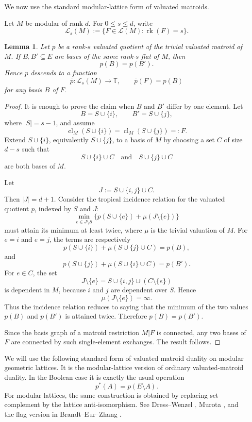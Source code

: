 \documentclass[11pt]{article}
\newcommand{\rk}{\operatorname{rk}}
\newcommand{\cl}{\operatorname{cl}}
\newcommand{\cL}{\mathcal L}
\theoremstyle{plain}
\newtheorem{lemma}[theorem]{Lemma}
\theoremstyle{definition}
\begin{document}
We now use the standard modular-lattice form of valuated matroids.

Let \(M\) be modular of rank \(d\).  For \(0\le s\le d\), write
\[
   \cL_s(M):=\{F\in \cL(M):\rk(F)=s\}.
\]

\begin{lemma}\label{lem:flat-invariance}
Let \(p\) be a rank-\(s\) valuated quotient of the trivial valuated matroid of \(M\).  If \(B,B'\subseteq E\) are bases of the same rank-\(s\) flat of \(M\), then
\[
   p(B)=p(B').
\]
Hence \(p\) descends to a function
\[
   \bar p:\cL_s(M)\longrightarrow \mathbb T,\qquad
   \bar p(F)=p(B)
\]
for any basis \(B\) of \(F\).
\end{lemma}

\begin{proof}
It is enough to prove the claim when \(B\) and \(B'\) differ by one element.  Let
\[
   B=S\cup\{i\},\qquad B'=S\cup\{j\},
\]
where \(|S|=s-1\), and assume
\[
   \cl_M(S\cup\{i\})=\cl_M(S\cup\{j\})=:F.
\]
Extend \(S\cup\{i\}\), equivalently \(S\cup\{j\}\), to a basis of \(M\) by choosing a set \(C\) of size \(d-s\) such that
\[
   S\cup\{i\}\cup C
   \quad\text{and}\quad
   S\cup\{j\}\cup C
\]
are both bases of \(M\).

Let
\[
   J:=S\cup\{i,j\}\cup C.
\]
Then \(|J|=d+1\).  Consider the tropical incidence relation for the valuated quotient \(p\), indexed by \(S\) and \(J\):
\[
   \min_{e\in J\setminus S}\{p(S\cup\{e\})+\mu(J\setminus\{e\})\}
\]
must attain its minimum at least twice, where \(\mu\) is the trivial valuation of \(M\).  For \(e=i\) and \(e=j\), the terms are respectively
\[
   p(S\cup\{i\})+\mu(S\cup\{j\}\cup C)=p(B),
\]
and
\[
   p(S\cup\{j\})+\mu(S\cup\{i\}\cup C)=p(B').
\]
For \(e\in C\), the set
\[
   J\setminus\{e\}=S\cup\{i,j\}\cup(C\setminus\{e\})
\]
is dependent in \(M\), because \(i\) and \(j\) are dependent over \(S\).  Hence
\[
   \mu(J\setminus\{e\})=\infty.
\]
Thus the incidence relation reduces to saying that the minimum of the two values \(p(B)\) and \(p(B')\) is attained twice.  Therefore \(p(B)=p(B')\).

Since the basis graph of a matroid restriction \(M|F\) is connected, any two bases of \(F\) are connected by such single-element exchanges.  The result follows.
\end{proof}

We will use the following standard form of valuated matroid duality on modular geometric lattices.  It is the modular-lattice version of ordinary valuated-matroid duality.  In the Boolean case it is exactly the usual operation
\[
   p^*(A)=p(E\setminus A).
\]
For modular lattices, the same construction is obtained by replacing set-complement by the lattice anti-isomorphism.  See Dress--Wenzel \cite{DW}, Murota \cite[Ch.~4]{Murota}, and the flag version in Brandt--Eur--Zhang \cite{BEZ}.
\end{document}
